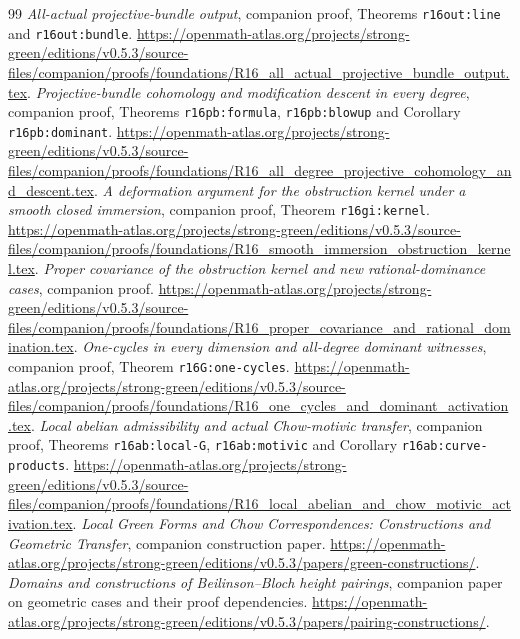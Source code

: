 \documentclass[11pt,a4paper]{article}
\theoremstyle{definition}
\theoremstyle{remark}
\numberwithin{equation}{section}
\begin{document}
\begin{thebibliography}{99}
 \emph{All-actual projective-bundle output}, companion proof, Theorems \texttt{r16out:line} and \texttt{r16out:bundle}. \url{https://openmath-atlas.org/projects/strong-green/editions/v0.5.3/source-files/companion/proofs/foundations/R16_all_actual_projective_bundle_output.tex}.
 \emph{Projective-bundle cohomology and modification descent in every degree}, companion proof, Theorems \texttt{r16pb:formula}, \texttt{r16pb:blowup} and Corollary \texttt{r16pb:dominant}. \url{https://openmath-atlas.org/projects/strong-green/editions/v0.5.3/source-files/companion/proofs/foundations/R16_all_degree_projective_cohomology_and_descent.tex}.
 \emph{A deformation argument for the obstruction kernel under a smooth closed immersion}, companion proof, Theorem \texttt{r16gi:kernel}. \url{https://openmath-atlas.org/projects/strong-green/editions/v0.5.3/source-files/companion/proofs/foundations/R16_smooth_immersion_obstruction_kernel.tex}.
 \emph{Proper covariance of the obstruction kernel and new rational-dominance cases}, companion proof. \url{https://openmath-atlas.org/projects/strong-green/editions/v0.5.3/source-files/companion/proofs/foundations/R16_proper_covariance_and_rational_domination.tex}.
 \emph{One-cycles in every dimension and all-degree dominant witnesses}, companion proof, Theorem \texttt{r16G:one-cycles}. \url{https://openmath-atlas.org/projects/strong-green/editions/v0.5.3/source-files/companion/proofs/foundations/R16_one_cycles_and_dominant_activation.tex}.
 \emph{Local abelian admissibility and actual Chow-motivic transfer}, companion proof, Theorems \texttt{r16ab:local-G}, \texttt{r16ab:motivic} and Corollary \texttt{r16ab:curve-products}. \url{https://openmath-atlas.org/projects/strong-green/editions/v0.5.3/source-files/companion/proofs/foundations/R16_local_abelian_and_chow_motivic_activation.tex}.
 \emph{Local Green Forms and Chow Correspondences: Constructions and Geometric Transfer}, companion construction paper. \url{https://openmath-atlas.org/projects/strong-green/editions/v0.5.3/papers/green-constructions/}.
 \emph{Domains and constructions of Beilinson--Bloch height pairings}, companion paper on geometric cases and their proof dependencies. \url{https://openmath-atlas.org/projects/strong-green/editions/v0.5.3/papers/pairing-constructions/}.
\end{thebibliography}
\end{document}
